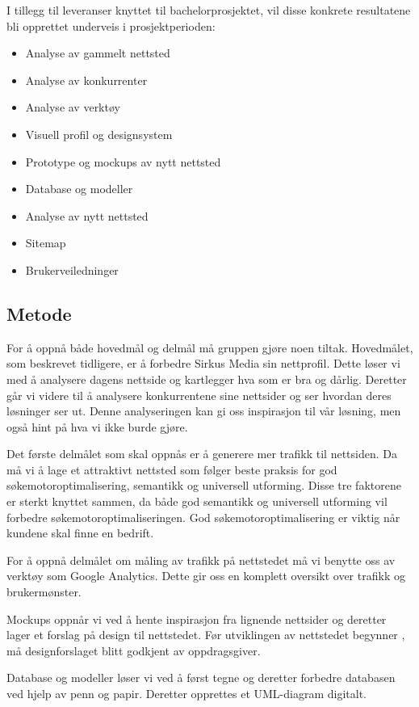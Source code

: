 I tillegg til leveranser knyttet til bachelorprosjektet, vil disse konkrete resultatene bli opprettet underveis i prosjektperioden:
\begin{itemize}
\item Analyse av gammelt nettsted
\item Analyse av konkurrenter
\item Analyse av verktøy
\item Visuell profil og designsystem
\item Prototype og mockups av nytt nettsted
\item Database og modeller
\item Analyse av nytt nettsted
\item Sitemap
\item Brukerveiledninger
\end{itemize}

\subsection{Metode}
\label{sec:metode}
For å oppnå både hovedmål og delmål må gruppen gjøre noen tiltak. Hovedmålet, som beskrevet tidligere, er å forbedre Sirkus Media sin nettprofil. Dette løser vi med å analysere dagens nettside og kartlegger hva som er bra og dårlig. Deretter går vi videre til å analysere konkurrentene sine nettsider og ser hvordan deres løsninger ser ut. Denne analyseringen kan gi oss inspirasjon til vår løsning, men også hint på hva vi ikke burde gjøre.

Det første delmålet som skal oppnås er å generere mer trafikk til nettsiden. Da må vi å lage et attraktivt nettsted som følger beste praksis for god søkemotoroptimalisering, semantikk og universell utforming. Disse tre faktorene er sterkt knyttet sammen, da både god semantikk og universell utforming vil forbedre søkemotoroptimaliseringen. God søkemotoroptimalisering er viktig når kundene skal finne en bedrift.

For å oppnå delmålet om måling av trafikk på nettstedet må vi benytte oss av verktøy som Google Analytics. Dette gir oss en komplett oversikt over trafikk og brukermønster.

Mockups oppnår vi ved å hente inspirasjon fra lignende nettsider og deretter lager et forslag på design til nettstedet. Før utviklingen av nettstedet begynner , må designforslaget blitt godkjent av oppdragsgiver.

Database og modeller løser vi ved å først tegne og deretter forbedre databasen ved hjelp av penn og papir. Deretter opprettes et UML-diagram digitalt.

